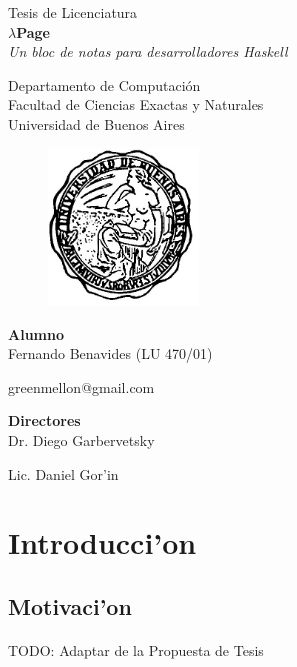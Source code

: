 \documentclass[a4paper]{article}
\begin{document}
	\thispagestyle{empty}
	\begin{center}
	{\Large Tesis de Licenciatura}\\[1em]
	{\huge \textbf{$\lambda$Page}}\\[0.5em]
	{\large \textit{Un bloc de notas para desarrolladores Haskell}}\\[1em]
	\par{}
	{\large Departamento de Computaci\'on}\\[0.5em]
	{\large Facultad de Ciencias Exactas y Naturales}\\[0.5em]
	{\large Universidad de Buenos Aires}
	\begin{figure}[h]
		\begin{center}
		\includegraphics[width=40mm]{logoUba}
		\end{center}
	\end{figure}
	\par{}
	{\Large \textbf{Alumno}}\\[0.8em]
	{\Large Fernando Benavides (LU 470/01)} \par
	{\Large greenmellon@gmail.com} \par
	\par{}
	{\Large \textbf{Directores}}\\[0.8em]
	{\Large Dr. Diego Garbervetsky} \par
	{\Large Lic. Daniel Gor'in}
	\end{center}
	\newpage

\tableofcontents
\newpage

\section{Introducci'on}
\subsection{Motivaci'on}
\paragraph{}TODO: Adaptar de la Propuesta de Tesis
\end{document}
